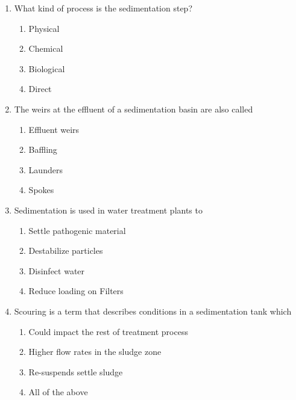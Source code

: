 \begin{enumerate}
\item  What kind of process is the sedimentation step?\\
\begin{enumerate}
\item Physical\\
\item Chemical\\
\item Biological\\
\item Direct
\end{enumerate}

\item  The weirs at the effluent of a sedimentation basin are also called\\
\begin{enumerate}
\item Effluent weirs\\
\item Baffling\\
\item Launders\\
\item Spokes
\end{enumerate}

\item  Sedimentation is used in water treatment plants to\\
\begin{enumerate}
\item Settle pathogenic material\\
\item Destabilize particles\\
\item Disinfect water\\
\item Reduce loading on Filters
\end{enumerate}

\item  Scouring is a term that describes conditions in a sedimentation tank which\\
\begin{enumerate}
\item Could impact the rest of treatment process\\
\item Higher flow rates in the sludge zone\\
\item Re-suspends settle sludge\\
\item All of the above
\end{enumerate}


\end{enumerate}
